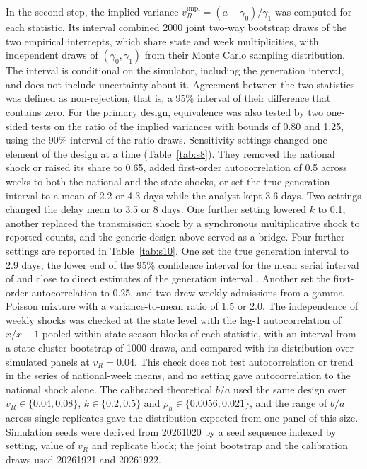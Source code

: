 In the second step, the implied variance $v_R^{\mathrm{impl}}=(a-\gamma_0)/\gamma_1$ was computed for each statistic. Its interval combined 2000 joint two-way bootstrap draws of the two empirical intercepts, which share state and week multiplicities, with independent draws of $(\gamma_0,\gamma_1)$ from their Monte Carlo sampling distribution. The interval is conditional on the simulator, including the generation interval, and does not include uncertainty about it. Agreement between the two statistics was defined as non-rejection, that is, a 95\% interval of their difference that contains zero. For the primary design, equivalence was also tested by two one-sided tests on the ratio of the implied variances with bounds of 0.80 and 1.25, using the 90\% interval of the ratio draws. Sensitivity settings changed one element of the design at a time (Table~\ref{tab:s8}). They removed the national shock or raised its share to 0.65, added first-order autocorrelation of 0.5 across weeks to both the national and the state shocks, or set the true generation interval to a mean of 2.2 or 4.3 days while the analyst kept 3.6 days. Two settings changed the delay mean to 3.5 or 8 days. One further setting lowered $k$ to 0.1, another replaced the transmission shock by a synchronous multiplicative shock to reported counts, and the generic design above served as a bridge. Four further settings are reported in Table~\ref{tab:s10}. One set the true generation interval to 2.9 days, the lower end of the 95\% confidence interval for the mean serial interval of \citet{cowling2009estimation} and close to direct estimates of the generation interval \citep{chan2025estimating}. Another set the first-order autocorrelation to 0.25, and two drew weekly admissions from a gamma--Poisson mixture with a variance-to-mean ratio of 1.5 or 2.0. The independence of weekly shocks was checked at the state level with the lag-1 autocorrelation of $x/\bar{x}-1$ pooled within state-season blocks of each statistic, with an interval from a state-cluster bootstrap of 1000 draws, and compared with its distribution over simulated panels at $v_R=0.04$. This check does not test autocorrelation or trend in the series of national-week means, and no setting gave autocorrelation to the national shock alone. The calibrated theoretical $b/a$ used the same design over $v_R\in\{0.04,0.08\}$, $k\in\{0.2,0.5\}$ and $\rho_h\in\{0.0056,0.021\}$, and the range of $b/a$ across single replicates gave the distribution expected from one panel of this size. Simulation seeds were derived from 20261020 by a seed sequence indexed by setting, value of $v_R$ and replicate block; the joint bootstrap and the calibration draws used 20261921 and 20261922.

